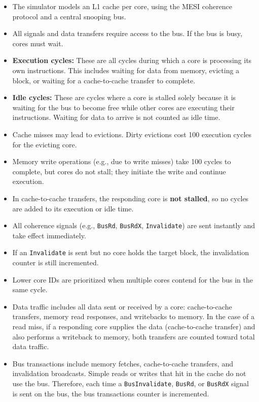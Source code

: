\documentclass[a4paper,12pt]{article}
\begin{document}
\begin{itemize}
    \item The simulator models an L1 cache per core, using the MESI coherence protocol and a central snooping bus.
    
    \item All signals and data transfers require access to the bus. If the bus is busy, cores must wait.
    
    \item \textbf{Execution cycles:} These are all cycles during which a core is processing its own instructions. This includes waiting for data from memory, evicting a block, or waiting for a cache-to-cache transfer to complete.
    
    \item \textbf{Idle cycles:} These are cycles where a core is stalled solely because it is waiting for the bus to become free while other cores are executing their instructions. Waiting for data to arrive is not counted as idle time.
    
    \item Cache misses may lead to evictions. Dirty evictions cost 100 execution cycles for the evicting core.
    
    \item Memory write operations (e.g., due to write misses) take 100 cycles to complete, but cores do not stall; they initiate the write and continue execution.
    
    \item In cache-to-cache transfers, the responding core is \textbf{not stalled}, so no cycles are added to its execution or idle time.
    
    \item All coherence signals (e.g., \texttt{BusRd}, \texttt{BusRdX}, \texttt{Invalidate}) are sent instantly and take effect immediately.
    
    \item If an \texttt{Invalidate} is sent but no core holds the target block, the invalidation counter is still incremented.
    
    \item Lower core IDs are prioritized when multiple cores contend for the bus in the same cycle.
    
    \item Data traffic includes all data sent or received by a core: cache-to-cache transfers, memory read responses, and writebacks to memory. In the case of a read miss, if a responding core supplies the data (cache-to-cache transfer) and also performs a writeback to memory, both transfers are counted toward total data traffic.
    
    \item Bus transactions include memory fetches, cache-to-cache transfers, and invalidation broadcasts. Simple reads or writes that hit in the cache do not use the bus. Therefore, each time a \texttt{BusInvalidate}, \texttt{BusRd}, or \texttt{BusRdX} signal is sent on the bus, the bus transactions counter is incremented.
\end{itemize}
\end{document}
